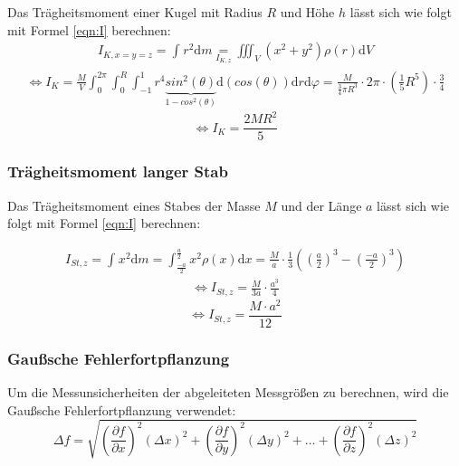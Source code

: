 Das Trägheitsmoment einer Kugel mit Radius $R$ und Höhe $h$ lässt sich wie folgt mit Formel \ref{eqn:I} berechnen:
\begin{align*}
    I_{K,x=y=z} = \int_{}^{}r^2 \mathrm{d}m \underset{I_{K,z}}{=} \iiint_{V}^{} (x^2 + y^2) \rho(r) \mathrm{d}V    
\end{align*}
\begin{align*}
    \Leftrightarrow I_K = \frac{M}{V} \int_{0}^{2\pi} \int_{0}^{R} \int_{-1}^{1}r^4 \underbrace{sin^2(\theta)}_{\text{$1 - cos^2(\theta)$}}  \mathrm{d}(cos(\theta)) \mathrm{d}r \mathrm{d}\varphi = \frac{M}{\frac{3}{4} \pi R^3} \cdot 2\pi \cdot \left(\frac{1}{5}R^5 \right) \cdot \frac{3}{4} 
\end{align*}
\begin{equation}
    \label{eqn:Ik}
    \Leftrightarrow I_K = \frac{2MR^2}{5}
\end{equation}

\subsubsection{Trägheitsmoment langer Stab}

Das Trägheitsmoment eines Stabes der Masse $M$ und der Länge $a$ lässt sich wie folgt mit Formel \ref{eqn:I} berechnen:

\begin{align*}
    I_{St,z} = \int_{}^{}x^2 \mathrm{d}m = \int_{\frac{-a}{2}}^{\frac{a}{2}} x^2 \rho(x) \mathrm{d}x = \frac{M}{a} \cdot \frac{1}{3} \left( \left(\frac{a}{2} \right)^3 - \left(\frac{-a}{2} \right)^3 \right)
\end{align*}
\begin{align*}
    \Leftrightarrow I_{St,z} = \frac{M}{3a} \cdot \frac{a^3}{4}
\end{align*}
\begin{equation}
    \Leftrightarrow I_{St,z} = \frac{M \cdot a^2}{12}
\end{equation}


\subsubsection{Gaußsche Fehlerfortpflanzung}

Um die Messunsicherheiten der abgeleiteten Messgrößen zu berechnen, wird die Gaußsche Fehlerfortpflanzung verwendet:
\begin{equation}
    \label{eqn:Gauss}
    \Delta f = \sqrt{\left( \frac{\partial f}{\partial x} \right)^2 (\Delta x)^2 + \left( \frac{\partial f}{\partial y} \right)^2 (\Delta y)^2 + \ldots + \left( \frac{\partial f}{\partial z} \right)^2 (\Delta z)^2 }
\end{equation}
\newpage